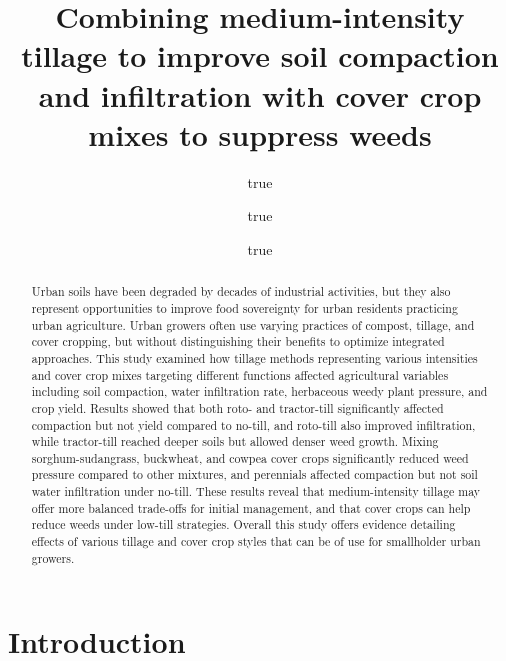 \documentclass[
  12pt,
]{article}
\title{Combining medium-intensity tillage to improve soil compaction and infiltration with cover crop mixes to suppress weeds}
\author{true \and true \and true}
\date{}
\begin{document}
\maketitle
\begin{abstract}
Urban soils have been degraded by decades of industrial activities, but they also represent opportunities to improve food sovereignty for urban residents practicing urban agriculture.
Urban growers often use varying practices of compost, tillage, and cover cropping, but without distinguishing their benefits to optimize integrated approaches.
This study examined how tillage methods representing various intensities and cover crop mixes targeting different functions affected agricultural variables including soil compaction, water infiltration rate, herbaceous weedy plant pressure, and crop yield.
Results showed that both roto- and tractor-till significantly affected compaction but not yield compared to no-till, and roto-till also improved infiltration, while tractor-till reached deeper soils but allowed denser weed growth.
Mixing sorghum-sudangrass, buckwheat, and cowpea cover crops significantly reduced weed pressure compared to other mixtures, and perennials affected compaction but not soil water infiltration under no-till.
These results reveal that medium-intensity tillage may offer more balanced trade-offs for initial management, and that cover crops can help reduce weeds under low-till strategies.
Overall this study offers evidence detailing effects of various tillage and cover crop styles that can be of use for smallholder urban growers.
\end{abstract}

{
\setcounter{tocdepth}{2}
\tableofcontents
}
\hypertarget{introduction}{%
\section{Introduction}\label{introduction}}
\end{document}
